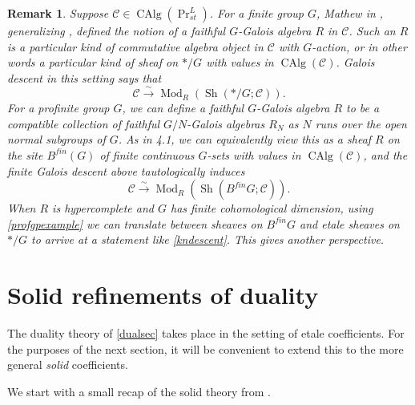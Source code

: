 \documentclass[12pt]{article}
\newtheorem{remark}[theorem]{Remark}
\newcommand{\on}{\operatorname}
\begin{document}
\begin{remark}\label{alternatedescent}
Suppose $\mathcal{C}\in\on{CAlg}(\on{Pr}^L_{st})$.  For a finite group $G$, Mathew in \cite{MathewGalois}, generalizing \cite{RognesGalois}, defined the notion of a faithful $G$-Galois algebra $R$ in $\mathcal{C}$.  Such an $R$ is a particular kind of commutative algebra object in $\mathcal{C}$ with $G$-action, or in other words a particular kind of sheaf on $\ast/G$ with values in $\on{CAlg}(\mathcal{C})$.  Galois descent in this setting says that
$$\mathcal{C}\overset{\sim}{\rightarrow}\on{Mod}_R(\on{Sh}(\ast/G;\mathcal{C})).$$
For a profinite group $G$, we can define a faithful $G$-Galois algebra $R$ to be a compatible collection of faithful $G/N$-Galois algebras $R_N$ as $N$ runs over the open normal subgroups of $G$.  As in \cite{ClausenHyper} 4.1, we can equivalently view this as a sheaf $R$ on the site $B^{fin}(G)$ of finite continuous $G$-sets with values in $\on{CAlg}(\mathcal{C})$, and the finite Galois descent above tautologically induces
$$\mathcal{C}\overset{\sim}{\rightarrow}\on{Mod}_R(\on{Sh}(B^{fin}G;\mathcal{C})).$$
When $R$ is hypercomplete and $G$ has finite cohomological dimension, using \ref{profgpexample} we can translate between sheaves on $B^{fin}G$ and etale sheaves on $\ast/G$ to arrive at a statement like \ref{kndescent}.  This gives another perspective.
\end{remark}

\section{Solid refinements of duality}\label{solidsec}

The duality theory of \ref{dualsec} takes place in the setting of etale coefficients.  For the purposes of the next section, it will be convenient to extend this to the more general \emph{solid} coefficients.

We start with a small recap of the solid theory from \cite{ClausenCondensed}.
\end{document}
